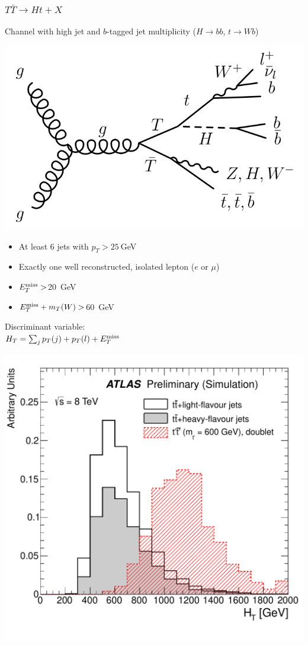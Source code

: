 \documentclass[xcolor=dvipsnames,10pt]{beamer}
\begin{document}
\begin{frame}\frametitle{$T\bar{T}\to Ht+X$~\cite{ATLAS-CONF-2013-018}}
\footnotesize\centering

Channel with high jet and $b$-tagged jet multiplicity ($H\to bb$, $t\to Wb$)

  \begin{minipage}{.55\textwidth}\scriptsize\centering

       \includegraphics[width=.5\textwidth]{htx/feynhtx}

  \begin{minipage}{.4\textwidth}\tiny\centering

       \begin{itemize}
\item At least 6 jets with $p_T>25~$GeV
\item Exactly one well reconstructed, isolated lepton ($e$ or $\mu$)
\item ${E}^{\rm miss}_T >$20~GeV
\item ${E}^{\rm miss}_T + m_T(W)>$60~GeV
       \end{itemize}

\end{minipage}\begin{minipage}{.6\textwidth}\centering

\myskip

\alert{Discriminant variable}: \\$H_T=\sum_j p_T(j) + p_T(l) + {E}^{\rm miss}_T$

       \includegraphics[width=1.\textwidth]{htx/fig_02b.pdf}



\end{minipage}
\end{minipage}
\end{frame}
\end{document}
